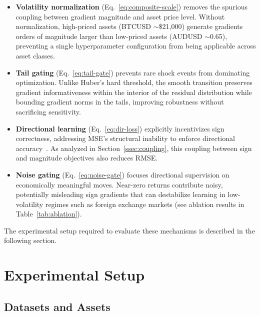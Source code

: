 \documentclass[11pt]{article}
\begin{document}
\begin{itemize}
\item \textbf{Volatility normalization} (Eq.~\ref{eq:composite-scale})
  removes the spurious coupling between gradient magnitude and asset
  price level. Without normalization, high-priced assets
  (BTCUSD $\sim$\$21{,}000) generate gradients orders of magnitude
  larger than low-priced assets (AUDUSD $\sim$0.65), preventing a
  single hyperparameter configuration from being applicable across
  asset classes.

\item \textbf{Tail gating} (Eq.~\ref{eq:tail-gate}) prevents rare
  shock events from dominating optimization. Unlike Huber's hard
  threshold, the smooth transition preserves gradient informativeness
  within the interior of the residual distribution while bounding
  gradient norms in the tails, improving robustness without
  sacrificing sensitivity.

\item \textbf{Directional learning} (Eq.~\ref{eq:dir-loss})
  explicitly incentivizes sign correctness, addressing MSE's
  structural inability to enforce directional
  accuracy~\citep{leitch1991economic,pesaran1992simple}. As analyzed
  in Section~\ref{ssec:coupling}, this coupling between sign and
  magnitude objectives also reduces RMSE.

\item \textbf{Noise gating} (Eq.~\ref{eq:noise-gate}) focuses
  directional supervision on economically meaningful moves. Near-zero
  returns contribute noisy, potentially misleading sign gradients
  that can destabilize learning in low-volatility regimes such as
  foreign exchange markets (see ablation results in
  Table~\ref{tab:ablation}).
\end{itemize}

The experimental setup required to evaluate these mechanisms is
described in the following section.

\FloatBarrier
\section{Experimental Setup}
\label{sec:setup}

\subsection{Datasets and Assets}
\end{document}
